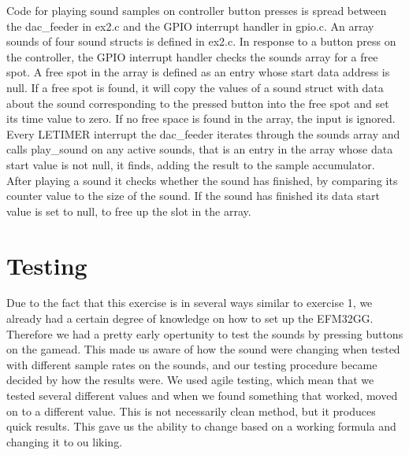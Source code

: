 Code for playing sound samples on controller button presses is spread between
the dac\_feeder in ex2.c and the GPIO interrupt handler in gpio.c. An array
sounds of four sound structs is defined in ex2.c. In response to a button press
on the controller, the GPIO interrupt handler checks the sounds array for a free
spot. A free spot in the array is defined as an entry whose start data address
is null. If a free spot is found, it will copy the values of a sound struct with
data about the sound corresponding to the pressed button into the free spot and
set its time value to zero. If no free space is found in the array, the input is
ignored. Every LETIMER interrupt the dac\_feeder iterates through the sounds
array and calls play\_sound on any active sounds, that is an entry in the array
whose data start value is not null, it finds, adding the result to the sample
accumulator. After playing a sound it checks whether the sound has finished, by
comparing its counter value to the size of the sound. If the sound has finished
its data start value is set to null, to free up the slot in the array.

\section{Testing}

Due to the fact that this exercise is in several ways similar to exercise 1, we
already had a certain degree of knowledge on how to set up the EFM32GG.
Therefore we had a pretty early opertunity to test the sounds by pressing
buttons on the gamead. This made us aware of how the sound were changing when
tested with different sample rates on the sounds, and our testing procedure
became decided by how the results were. We used agile testing, which mean that
we tested several different values and when we found something that worked,
moved on to a different value. This is not necessarily clean method, but it
produces quick results. This gave us the ability to change based on a working
formula and changing it to ou liking.
